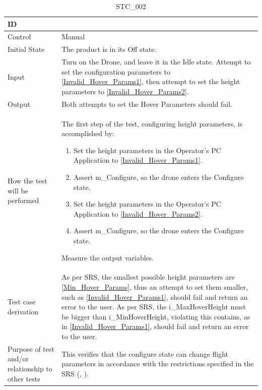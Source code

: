 \documentclass[12pt, titlepage]{article}
\begin{document}
\begin{table}[!h]
\begin{center}
\caption {STC\_002}
\label{tab:STC_002}
\begin{tabular}{ | m{1.5cm} | m{15cm} | } 
\hline
ID & \nameref{tab:STC_002} \\ 
\hline
Control & Manual \\ 
\hline
Initial State & The product is in its Off state. \\ 
\hline
Input & Turn on the Drone, and leave it in the Idle state. Attempt to set the configuration parameters to \ref{Invalid_Hover_Params1}, then attempt to set the height parameters to \ref{Invalid_Hover_Params2}.  \\
\hline
Output & Both attempts to set the Hover Parameters should fail. \\ 
\hline
How the test will be performed & 
The first step of the test, configuring height parameters, is accomplished by:
\begin{enumerate}[topsep=0pt,itemsep=-1ex,partopsep=1ex,parsep=1ex]
    \item Set the height parameters in the Operator's PC Application to \ref{Invalid_Hover_Params1}.
    \item Assert m\_Configure, so the drone enters the Configure state.
    \item Set the height parameters in the Operator's PC Application to \ref{Invalid_Hover_Params2}.
    \item Assert m\_Configure, so the drone enters the Configure state.
\end{enumerate}
Measure the output variables. \\
\hline
Test case derivation & As per SRS, the smallest possible height parameters are \ref{Min_Hover_Params}, thus an attempt to set them smaller, such as \ref{Invalid_Hover_Params1}, should fail and return an error to the user. 
As per SRS, the i\_MaxHoverHeight must be bigger than i\_MinHoverHeight, violating this contains, as in  \ref{Invalid_Hover_Params1}, should fail and return an error to the user.
\\ 
\hline
Purpose of test and/or relationship to other tests & This verifies that the configure state can change flight parameters in accordance with the restrictions specified in the SRS (\nameref{SAFE_002}, \nameref{GEN_004}). \\
\hline
\end{tabular}
\end{center}
\end{table}
\end{document}

